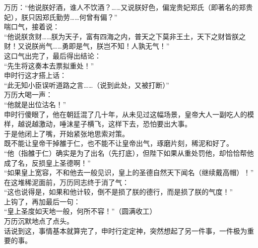 \begin{multicols}{\theparacolNo}
万历：“他说朕好酒，谁人不饮酒？……又说朕好色，偏宠贵妃郑氏（即著名的郑贵妃），朕只因郑氏勤劳……何曾有偏？”\\

喘口气，接着说：\\

“他说朕贪财……朕为天子，富有四海之内，普天之下莫非王土，天下之财皆朕之财！又说朕尚气……勇即是气，朕岂不知！人孰无气！”\\

这口气出完了，最后得出结论：\\

“先生将这奏本去票拟重处！”\\

申时行这才搭上话：\\

“此无知小臣误听道路之言……（说到此处，又被打断）”\\

万历大喝一声：\\

“他就是出位沽名！”\\

申时行傻眼了，他在朝廷混了几十年，从未见过这幅场景，皇帝大人一副吃人的模样，越说越激动，唾沫星子横飞，这样下去，恐怕要出大事。\\

于是他闭上了嘴，开始紧张地思索对策。\\

既不能让皇帝干掉雒于仁，也不能不让皇帝出气，琢磨片刻，稀泥和好了。\\

“他（指雒于仁）确实是为了出名（先打底），但陛下如果从重处罚他，却恰恰帮他成了名，反损皇上圣德啊！”\\

“如果皇上宽容，不和他去一般见识，皇上的圣德自然天下闻名（继续戴高帽）！”\\

在这堆稀泥面前，万历同志终于消了气：\\

“这也说得是，如果和他计较，倒不是损了朕的德行，而是损了朕的气度！”\\

上钩了，再加最后一句：\\

“皇上圣度如天地一般，何所不容！”（圆满收工）\\

万历沉默地点了点头。\\

话说到这，事情基本就算完了，申时行定定神，突然想起了另一件事，一件极为重要的事。\\


\end{multicols}
